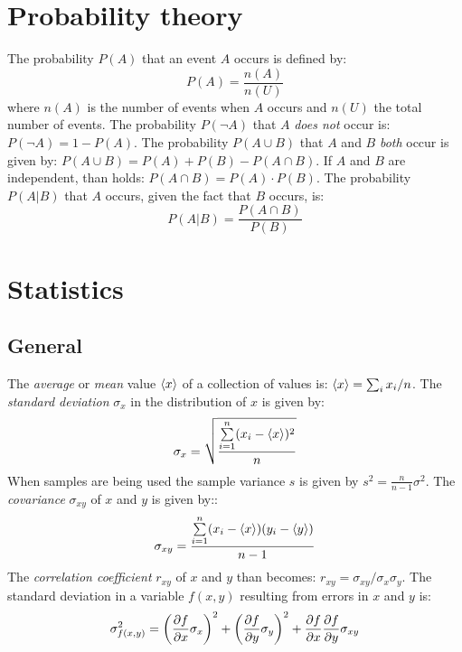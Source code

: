 \documentclass[a4paper,fancyheadings,twoside]{report}
\begin{document}
\section{Probability theory}
The probability $P(A)$ that an event $A$ occurs is defined by:
\[
P(A)=\frac{n(A)}{n(U)}
\]
where $n(A)$ is the number of events when $A$ occurs and $n(U)$ the total
number of events.
\npar
The probability $P(\neg A)$ that $A$ {\it does not} occur is: $P(\neg A)=1-P(A)$.
The probability $P(A\cup B)$ that $A$ and $B$ {\it both} occur is given by:
$P(A\cup B)=P(A)+P(B)-P(A\cap B)$. If $A$ and $B$ are independent, than holds:
$P(A\cap B)=P(A)\cdot P(B)$.
\npar
The probability $P(A|B)$ that $A$ occurs, given the fact that $B$ occurs, is:
\[
P(A|B)=\frac{P(A\cap B)}{P(B)}
\]

\section{Statistics}
\subsection{General}
The {\it average} or {\it mean} value $\left\langle x \right\rangle$ of a collection of values is:
$\left\langle x \right\rangle=\sum_i x_i/n$. The {\it standard deviation} $\sigma_x$ in the
distribution of $x$ is given by:
\[
\sigma_x=\sqrt{\frac{\sum\limits_{i=1}^n(x_i-\left\langle x \right\rangle)^2}{n}}
\]
When samples are being used the sample variance $s$ is given by
$\displaystyle s^2=\frac{n}{n-1}\sigma^2$.
\npar
The {\it covariance} $\sigma_{xy}$ of $x$ and $y$ is given by::
\[
\sigma_{xy}=\frac{\sum\limits_{i=1}^n(x_i-\left\langle x \right\rangle)(y_i-\left\langle y \right\rangle)}{n-1}
\]
The {\it correlation coefficient} $r_{xy}$ of $x$ and $y$ than becomes:
$r_{xy}=\sigma_{xy}/\sigma_x\sigma_y$.
\npar
The standard deviation in a variable $f(x,y)$ resulting from errors in
$x$ and $y$ is:
\[
\sigma^2_{f(x,y)}=\left(\frac{\partial f}{\partial x}\sigma_x\right)^2+\left(\frac{\partial f}{\partial y}\sigma_y\right)^2+
\frac{\partial f}{\partial x}\frac{\partial f}{\partial y}\sigma_{xy}
\]
\end{document}
